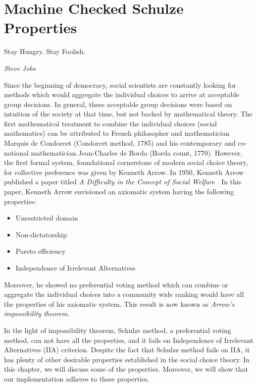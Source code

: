 \chapter{Machine Checked Schulze Properties}
\label{cha:machine_checked}

\epigraph{Stay Hungry. Stay Foolish.} 
{\textit{Steve Jobs}} 


 Since the beginning of democracy, social scientists are constantly looking for methods  which would 
 aggregate the individual choices  to arrive at acceptable group decisions. 
 In general, these acceptable group decisions were based on intuition of the society at that time,
 but not backed by mathematical theory. The first mathematical 
 treatment to combine the individual choices (social mathematics)  can be 
 attributed to French philosopher and mathematician Marquis de Condorcet (Condorcet method, 1785) and his contemporary
 and co-national mathematician Jean-Charles de Borda (Borda count, 1770). However, the first formal system, foundational cornerstone
 of modern social choice theory, for collective preference was given by Kenneth Arrow. In 1950, Kenneth Arrow 
 published a paper titled \textit{A Difficulty in the Concept of Social Welfare} \citep{arrow1950difficulty}. 
 In this paper, Kenneth Arrow envisioned an axiomatic system having the following properties:
 
 \begin{itemize}
 \item Unrestricted domain
 \item Non-dictatorship
 \item Pareto efficiency
 \item Independence of Irrelevant Alternatives
 \end{itemize}
 
 Moreover, he showed no preferential voting method which can combine or aggregate the individual choices into a community wide 
 ranking would have all the properties of his axiomatic system. This result is now known as \textit{Arrow's impossibility theorem}. 


 In the light of impossibility theorem, Schulze method, a preferential voting method, can not have all the properties, and it fails on 
 Independence of Irrelevant Alternatives (IIA) criterion. Despite the fact that Schulze method fails on IIA,  it has plenty of other desirable
 properties established in the social choice theory. In this chapter, we will discuss some of 
 the properties.  Moreover, we will show that our implementation adheres to these properties. 
 
